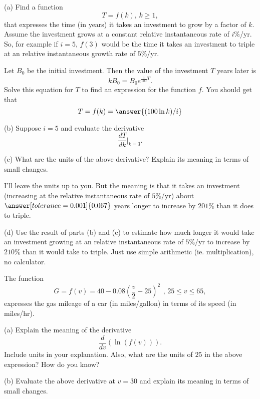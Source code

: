 \documentclass{ximera}
\begin{document}
\begin{question} \label{Qmf4566544}
(a) Find a function
\[
      T = f(k) , \, k\geq 1,
\]
that expresses the time (in years) it takes an investment to grow by a factor of $k$. Assume the investment grows at a constant relative instantaneous rate of $i\%$/yr. So, for example if $i=5$, $f(3)$ would be the time it takes an investment to triple at an relative instantaneous growth rate of $5\%$/yr.

\begin{hint}
Let $B_0$ be the initial investment. Then the value of the investment $T$ years later is 
\[
      kB_0  = B_0 e ^{\frac{i}{100}T} .
\]
Solve this equation for $T$ to find an expression for the function $f$. You should get that
\[
    T = f(k) = \answer{(100 \ln k)/i}
\]
\end{hint}

(b) Suppose $i=5$ and evaluate the derivative
\[
    \frac{dT}{dk} \Big|_{k=3} .
\]

(c) What are the units of the above derivative? Explain its meaning in terms of small changes.

I'll leave the units up to you. But the meaning is that it takes an investment (increasing at the relative instantaneous rate of $5\%$/yr) about $\answer[tolerance=0.001]{0.067}$ years longer to increase by $201\%$ than it does to triple. 

(d) Use the result of parts (b) and (c) to estimate how much longer it would take an investment growing at an relative instantaneous rate of $5\%$/yr to increase by $210\%$ than it would take to triple. Just use simple arithmetic (ie. multiplication), no calculator.
\end{question}


\begin{question}  \label{Qd654thmm}
The function 
\[ 
      G = f(v) = 40-0.08\left(\frac{v}{2}-25\right)^{2}\, \ , \, 25\leq v\leq 65 ,
\]
expresses the gas mileage of a car (in miles/gallon) in terms of its speed (in miles/hr).

(a) Explain the meaning of the derivative 
\[
     \frac{d}{dv} \left( \ln (f(v)) \right) .
\]
Include units in your explanation. Also, what are the units of $25$ in the above expression? How do you know?

(b) Evaluate the above derivative at $v=30$ and explain its meaning in terms of small changes.

\end{question}
\end{document}
